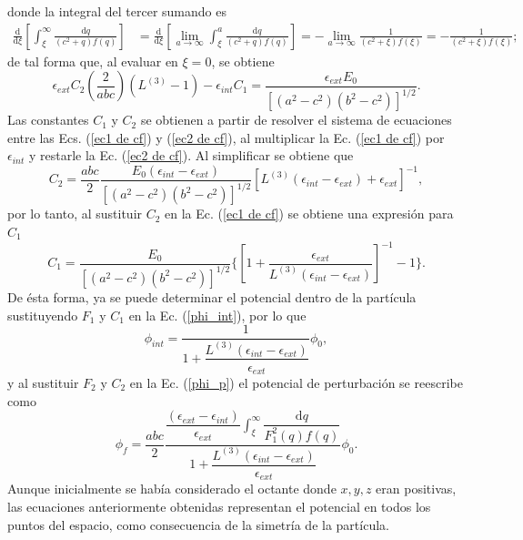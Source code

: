 donde la integral del tercer sumando es
\begin{align*}
    \frac{\text{d}}{\text{d}\xi}\left[\int_{\xi}^{\infty}\frac{\text{d}q}{(c^2+q)f(q)}\right]&=\frac{\text{d}}{\text{d}\xi}\left[\lim_{a\to\infty}\int_{\xi}^{a}\frac{\text{d}q}{(c^2+q)f(q)}\right]=-\lim_{a\to\infty}\frac{1}{(c^2+\xi)f(\xi)}=-\frac{1}{(c^2+\xi)f(\xi)};
\end{align*}
de tal forma que, al evaluar en $\xi=0$, se obtiene
\begin{equation}
    \epsilon_{ext} C_2\left(\frac{2}{abc}\right)\left(L^{(3)}-1\right)- \epsilon_{int} C_1=\frac{\epsilon_{ext} E_0}{[(a^2-c^2)(b^2-c^2)]^{1/2}}.
     \label{ec2 de cf}
\end{equation}
Las constantes $C_1$ y $C_2$ se obtienen a partir de  resolver el sistema de ecuaciones entre las Ecs. (\ref{ec1 de cf}) y (\ref{ec2 de cf}), al multiplicar la Ec. (\ref{ec1 de cf}) por $\epsilon_{int}$ y restarle la Ec. (\ref{ec2 de cf}). Al simplificar se obtiene que
\begin{equation*}
    C_2=\frac{abc}{2}\frac{E_0(\epsilon_{int}-\epsilon_{ext})}{[(a^2-c^2)(b^2-c^2)]^{1/2}}\left[L^{(3)}(\epsilon_{int}-\epsilon_{ext})+\epsilon_{ext}\right]^{-1},
\end{equation*}
por lo tanto, al sustituir $C_2$ en la Ec. (\ref{ec1 de cf}) se obtiene una expresión para $C_1$
\begin{equation*}
    C_1=\frac{E_0}{[(a^2-c^2)(b^2-c^2)]^{1/2}}\Bigg\{ \left[1+\frac{\epsilon_{ext}}{L^{(3)}(\epsilon_{int}-\epsilon_{ext})}\right]^{-1}-1\Bigg\}.
\end{equation*}
De ésta forma, ya se puede determinar el potencial dentro de la partícula sustituyendo $F_1$ y $C_1$ en la Ec. (\ref{phi_int}), por lo que
\begin{equation}
	\phi_{int}=\frac{1}{1+\dfrac{L^{(3)}(\epsilon_{int}-\epsilon_{ext})}{\epsilon_{ext}}}\phi_0,
\end{equation}
y al sustituir $F_2$ y $C_2$ en la Ec. (\ref{phi_p}) el potencial de perturbación se reescribe como
\begin{equation}
	\phi_f=\frac{abc}{2}\frac{\dfrac{(\epsilon_{ext}-\epsilon_{int})}{\epsilon_{ext}}{\displaystyle\int_{\xi}^{\infty}}\dfrac{\text{d}q}{F_1^2(q)f(q)}}{1+\dfrac{L^{(3)}(\epsilon_{int}-\epsilon_{ext})}{\epsilon_{ext}}}\phi_0.
\end{equation}
Aunque inicialmente se había considerado el octante donde $x,y,z$ eran positivas, las ecuaciones anteriormente obtenidas representan el potencial en todos los puntos del espacio, como consecuencia de la simetría de la partícula.\\

